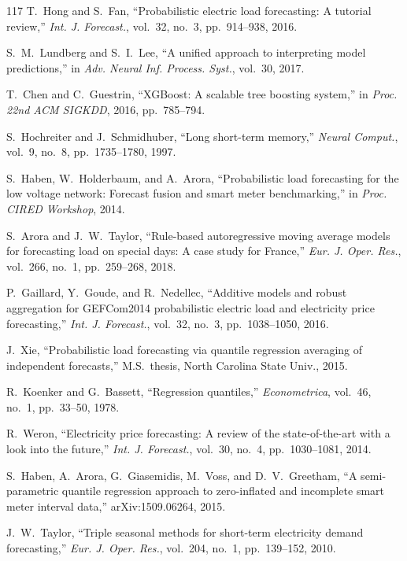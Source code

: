 \documentclass[12pt,a4paper]{article}
\begin{document}
\begin{thebibliography}{117}
 T.~Hong and S.~Fan, ``Probabilistic electric load forecasting: A tutorial review,'' \textit{Int. J. Forecast.}, vol.~32, no.~3, pp.~914--938, 2016.

 S.~M.~Lundberg and S.~I.~Lee, ``A unified approach to interpreting model predictions,'' in \textit{Adv. Neural Inf. Process. Syst.}, vol.~30, 2017.

 T.~Chen and C.~Guestrin, ``XGBoost: A scalable tree boosting system,'' in \textit{Proc. 22nd ACM SIGKDD}, 2016, pp.~785--794.

 S.~Hochreiter and J.~Schmidhuber, ``Long short-term memory,'' \textit{Neural Comput.}, vol.~9, no.~8, pp.~1735--1780, 1997.

 S.~Haben, W.~Holderbaum, and A.~Arora, ``Probabilistic load forecasting for the low voltage network: Forecast fusion and smart meter benchmarking,'' in \textit{Proc. CIRED Workshop}, 2014.

 S.~Arora and J.~W.~Taylor, ``Rule-based autoregressive moving average models for forecasting load on special days: A case study for France,'' \textit{Eur. J. Oper. Res.}, vol.~266, no.~1, pp.~259--268, 2018.

 P.~Gaillard, Y.~Goude, and R.~Nedellec, ``Additive models and robust aggregation for GEFCom2014 probabilistic electric load and electricity price forecasting,'' \textit{Int. J. Forecast.}, vol.~32, no.~3, pp.~1038--1050, 2016.

 J.~Xie, ``Probabilistic load forecasting via quantile regression averaging of independent forecasts,'' M.S.\ thesis, North Carolina State Univ., 2015.

 R.~Koenker and G.~Bassett, ``Regression quantiles,'' \textit{Econometrica}, vol.~46, no.~1, pp.~33--50, 1978.

 R.~Weron, ``Electricity price forecasting: A review of the state-of-the-art with a look into the future,'' \textit{Int. J. Forecast.}, vol.~30, no.~4, pp.~1030--1081, 2014.

 S.~Haben, A.~Arora, G.~Giasemidis, M.~Voss, and D.~V.~Greetham, ``A semi-parametric quantile regression approach to zero-inflated and incomplete smart meter interval data,'' arXiv:1509.06264, 2015.

 J.~W.~Taylor, ``Triple seasonal methods for short-term electricity demand forecasting,'' \textit{Eur. J. Oper. Res.}, vol.~204, no.~1, pp.~139--152, 2010.


\end{thebibliography}
\end{document}
